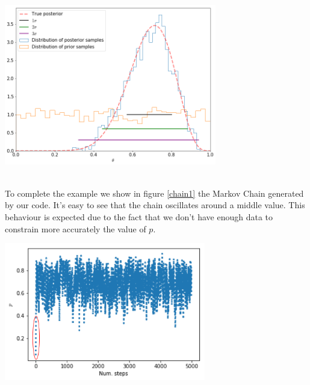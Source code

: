 \documentclass[onecolumn,           %
               showpacs,            %
               preprintnumbers,     %
               aps,                 %
               prl,          	    %
               letterpaper,             %
               superscriptaddress,      %
               nofootinbib,         %
               tightenlines,        %
               floats,floatfix      %
               ,usenatbib,
               ]{revtex4-1}
\begin{document}
\begin{minipage}{\textwidth}
\centering

\includegraphics[height=7cm]{Figures/posterior.png}
\label{posteriord}
\end{minipage}\\

\noindent To complete the example we show in figure \ref{chain1} the Markov Chain generated by our code. It's easy to see that the chain oscillates around a middle value. This behaviour is expected due to the fact that we don't have enough data to constrain more accurately the value of $p$.

\begin{minipage}{\textwidth}
\centering
\includegraphics[height=6cm]{Figures/chain1.png}
\label{chain1}
\end{minipage}\\ $ $ \\
\end{document}
